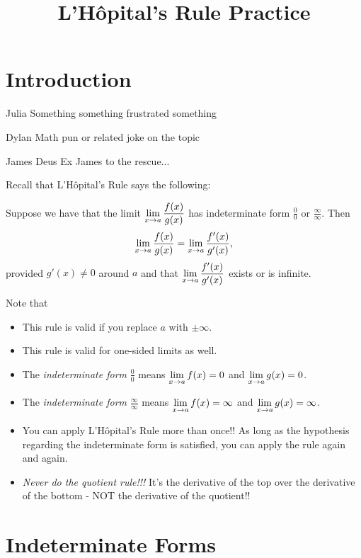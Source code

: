 \documentclass{ximera}
\title{L'H\^{o}pital's Rule Practice}
\newcommand{\LHop}{L'H\^{o}pital}
\begin{document}
\maketitle

\section{Introduction}
\begin{dialogue}
    \item[Julia] Something something frustrated something
    \item[Dylan] Math pun or related joke on the topic
    \item[James] Deus Ex James to the rescue...
\end{dialogue}

Recall that \LHop's Rule says the following:

\begin{theorem}
    Suppose we have that the limit $\displaystyle \lim_{x \to a} \displaystyle\frac{f(x)}{g(x)}$ has indeterminate form $\frac{0}{0}$ or $\frac{\infty}{\infty}$. Then
    \[
        \displaystyle \lim_{x \to a} \displaystyle\frac{f(x)}{g(x)} = \displaystyle \lim_{x \to a} \displaystyle\frac{f'(x)}{g'(x)},
    \]
provided $g'(x) \neq 0$ around $a$ and that $\displaystyle \lim_{x \to a} \displaystyle\frac{f'(x)}{g'(x)}$ exists or is infinite.
\end{theorem}


Note that
    \begin{itemize}
        \item This rule is valid if you replace $a$ with $\pm \infty$.
        \item This rule is valid for one-sided limits as well.
        \item The \emph{indeterminate form} $\frac{0}{0}$ means $\displaystyle \lim_{x \to a} f(x) = 0$ and $\displaystyle \lim_{x \to a} g(x) = 0$.
        \item The \emph{indeterminate form} $\frac{\infty}{\infty}$ means $\displaystyle \lim_{x \to a} f(x) = \infty$ and $\displaystyle \lim_{x \to a} g(x) = \infty$.
        \item You can apply L'H\^{o}pital's Rule more than once!! As long as the hypothesis regarding the indeterminate form is satisfied, you can apply the rule again and again.
        \item \emph{Never do the quotient rule!!!} It's the derivative of the top over the derivative of the bottom - NOT the derivative of the quotient!!
    \end{itemize} 


\section*{Indeterminate Forms}
\end{document}
